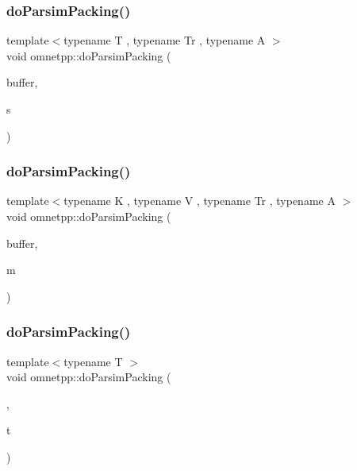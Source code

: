 \mbox{\label{namespaceomnetpp_a44c0e632aecd37f539392e96147deef0}} 
\subsubsection{\texorpdfstring{do\+Parsim\+Packing()}{doParsimPacking()}\hspace{0.1cm}{\footnotesize\ttfamily [3/5]}}
{\footnotesize\ttfamily template$<$typename T , typename Tr , typename A $>$ \\
void omnetpp\+::do\+Parsim\+Packing (\begin{DoxyParamCaption}\item[{omnetpp\+::c\+Comm\+Buffer $\ast$}]{buffer,  }\item[{const std\+::set$<$ T, Tr, A $>$ \&}]{s }\end{DoxyParamCaption})}

\mbox{\label{namespaceomnetpp_ae14adea382a91da2e1157d74981a946b}} 
\subsubsection{\texorpdfstring{do\+Parsim\+Packing()}{doParsimPacking()}\hspace{0.1cm}{\footnotesize\ttfamily [4/5]}}
{\footnotesize\ttfamily template$<$typename K , typename V , typename Tr , typename A $>$ \\
void omnetpp\+::do\+Parsim\+Packing (\begin{DoxyParamCaption}\item[{omnetpp\+::c\+Comm\+Buffer $\ast$}]{buffer,  }\item[{const std\+::map$<$ K, V, Tr, A $>$ \&}]{m }\end{DoxyParamCaption})}

\mbox{\label{namespaceomnetpp_a41f5f036ca92034bc3b29ad1f9f96903}} 
\subsubsection{\texorpdfstring{do\+Parsim\+Packing()}{doParsimPacking()}\hspace{0.1cm}{\footnotesize\ttfamily [5/5]}}
{\footnotesize\ttfamily template$<$typename T $>$ \\
void omnetpp\+::do\+Parsim\+Packing (\begin{DoxyParamCaption}\item[{omnetpp\+::c\+Comm\+Buffer $\ast$}]{,  }\item[{const T \&}]{t }\end{DoxyParamCaption})}

